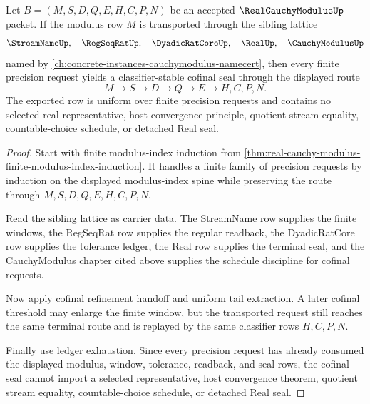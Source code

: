 \begin{theorem}
\label{thm:real-cauchy-modulus-uniform-cofinal-seal}
Let $B=(M,S,D,Q,E,H,C,P,N)$ be an accepted $\RealCauchyModulusUp$ packet. If the modulus row $M$ is transported through the sibling lattice
$$
\StreamNameUp,\quad \RegSeqRatUp,\quad \DyadicRatCoreUp,\quad \RealUp,\quad \CauchyModulusUp
$$
named by \autoref{ch:concrete-instances-cauchymodulus-namecert}, then every finite precision request yields a classifier-stable cofinal seal through the displayed route
$$
M \to S \to D \to Q \to E \to H,C,P,N .
$$
The exported row is uniform over finite precision requests and contains no selected real representative, host convergence principle, quotient stream equality, countable-choice schedule, or detached Real seal.
\end{theorem}
\begin{proof}
Start with finite modulus-index induction from \autoref{thm:real-cauchy-modulus-finite-modulus-index-induction}. It handles a finite family of precision requests by induction on the displayed modulus-index spine while preserving the route through $M,S,D,Q,E,H,C,P,N$.

Read the sibling lattice as carrier data. The StreamName row supplies the finite windows, the RegSeqRat row supplies the regular readback, the DyadicRatCore row supplies the tolerance ledger, the Real row supplies the terminal seal, and the CauchyModulus chapter cited above supplies the schedule discipline for cofinal requests.

Now apply cofinal refinement handoff and uniform tail extraction. A later cofinal threshold may enlarge the finite window, but the transported request still reaches the same terminal route and is replayed by the same classifier rows $H,C,P,N$.

Finally use ledger exhaustion. Since every precision request has already consumed the displayed modulus, window, tolerance, readback, and seal rows, the cofinal seal cannot import a selected representative, host convergence theorem, quotient stream equality, countable-choice schedule, or detached Real seal.
\end{proof}


